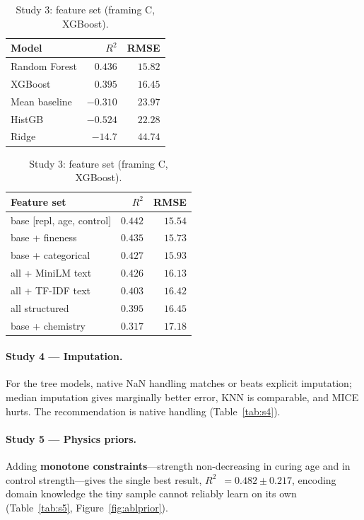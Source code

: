 \documentclass[11pt]{article}
\newcommand{\R}{$R^2$}
\begin{document}
\begin{table}[H]\centering\small
\begin{minipage}{0.46\textwidth}\centering
\caption{Study 2: model (framing C, all features).}
\label{tab:s2}
\begin{tabular}{lrr}
\toprule
Model & \R{} & RMSE \\
\midrule
\rowcolor{green!12}Random Forest & $0.436$ & $15.82$ \\
XGBoost & $0.395$ & $16.45$ \\
Mean baseline & $-0.310$ & $23.97$ \\
HistGB & $-0.524$ & $22.28$ \\
Ridge & $-14.7$ & $44.74$ \\
\bottomrule
\end{tabular}
\end{minipage}\hfill
\begin{minipage}{0.5\textwidth}\centering
\caption{Study 3: feature set (framing C, XGBoost).}
\label{tab:s3}
\begin{tabular}{lrr}
\toprule
Feature set & \R{} & RMSE \\
\midrule
\rowcolor{green!12}base [repl, age, control] & $0.442$ & $15.54$ \\
base + fineness & $0.435$ & $15.73$ \\
base + categorical & $0.427$ & $15.93$ \\
all + MiniLM text & $0.426$ & $16.13$ \\
all + TF-IDF text & $0.403$ & $16.42$ \\
all structured & $0.395$ & $16.45$ \\
base + chemistry & $0.317$ & $17.18$ \\
\bottomrule
\end{tabular}
\end{minipage}
\end{table}

\paragraph{Study 4 --- Imputation.}
For the tree models, native NaN handling matches or beats explicit imputation; median
imputation gives marginally better error, KNN is comparable, and MICE hurts. The
recommendation is native handling (Table~\ref{tab:s4}).

\paragraph{Study 5 --- Physics priors.}
Adding \textbf{monotone constraints}---strength non-decreasing in curing age and in
control strength---gives the single best result, \R{}~$=0.482\pm0.217$, encoding
domain knowledge the tiny sample cannot reliably learn on its own (Table~\ref{tab:s5},
Figure~\ref{fig:ablprior}).
\end{document}
